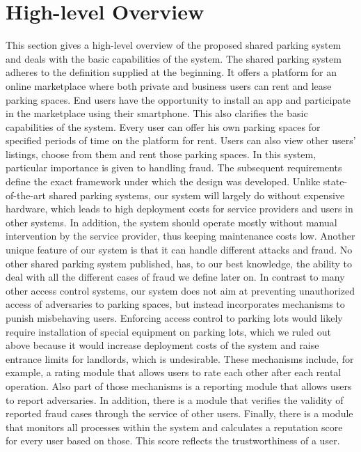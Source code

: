 \section{High-level Overview}\label{High-level Overview}
This section gives a high-level overview of the proposed shared parking system and deals with the basic capabilities of the system. The shared parking system adheres to the definition supplied at the beginning. It offers a platform for an online marketplace where both private and business users can rent and lease parking spaces. End users have the opportunity to install an app and participate in the marketplace using their smartphone. This also clarifies the basic capabilities of the system. Every user can offer his own parking spaces for specified periods of time on the platform for rent. Users can also view other users' listings, choose from them and rent those parking spaces. In this system, particular importance is given to handling fraud. The subsequent requirements define the exact framework under which the design was developed. Unlike state-of-the-art shared parking systems, our system will largely do without expensive hardware, which leads to high deployment costs for service providers and users in other systems. In addition, the system should operate mostly without manual intervention by the service provider, thus keeping maintenance costs low. Another unique feature of our system is that it can handle different attacks and fraud. No other shared parking system published, has, to our best knowledge, the ability to deal with all the different cases of fraud we define later on. In contrast to many other access control systems, our system does not aim at preventing unauthorized access of adversaries to parking spaces, but instead incorporates mechanisms to punish misbehaving users. Enforcing access control to parking lots would likely require installation of special equipment on parking lots, which we ruled out above because it would increase deployment costs of the system and raise entrance limits for landlords, which is undesirable. These mechanisms include, for example, a rating module that allows users to rate each other after each rental operation. Also part of those mechanisms is a reporting module that allows users to report adversaries. In addition, there is a module that verifies the validity of reported fraud cases through the service of other users. Finally, there is a module that monitors all processes within the system and calculates a reputation score for every user based on those. This score reflects the trustworthiness of a user.


